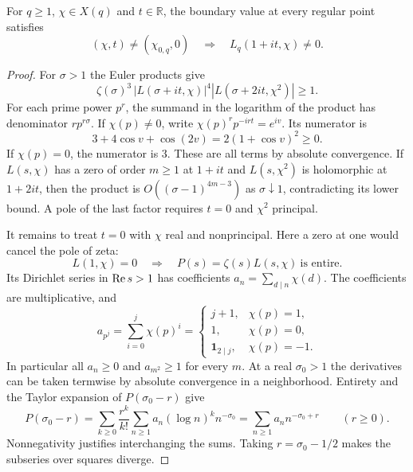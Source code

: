 \begin{lemma}\label{lem:boundary}
For \(q\ge1\), \(\chi\in X(q)\) and \(t\in\mathbb R\), the boundary
value at every regular point satisfies
\[
   (\chi,t)\ne(\chi_{0,q},0)\quad\Longrightarrow\quad
                       L_q(1+it,\chi)\ne0 .
\]
\end{lemma}

\begin{proof}
For \(\sigma>1\) the Euler products give
\[
 \zeta(\sigma)^3\,|L(\sigma+it,\chi)|^4
             |L(\sigma+2it,\chi^2)|\geq 1.
\]
For each prime power \(p^r\), the summand in the logarithm of
the product has denominator \(rp^{r\sigma}\). If \(\chi(p)\ne0\),
write \(\chi(p)^rp^{-irt}=e^{iv}\). Its numerator is
\[
             3+4\cos v+\cos(2v)=2(1+\cos v)^2\ge0.
\]
If \(\chi(p)=0\), the numerator is \(3\). These are all terms by
absolute convergence. If \(L(s,\chi)\) has a zero of order \(m\ge1\)
at \(1+it\) and \(L(s,\chi^2)\) is holomorphic at \(1+2it\),
then the product is \(O((\sigma-1)^{4m-3})\) as
\(\sigma\downarrow1\), contradicting its lower bound. A pole of
the last factor requires \(t=0\) and \(\chi^2\) principal.

It remains to treat \(t=0\) with \(\chi\) real and nonprincipal. Here a zero at one would cancel the pole of zeta:
\[
 L(1,\chi)=0\quad\Longrightarrow\quad P(s)=\zeta(s)L(s,\chi)\ \text{is entire}.
\] Its Dirichlet series in
\(\operatorname{Re} s>1\) has coefficients \(a_n=\sum_{d\mid n}\chi(d)\).
The coefficients are multiplicative, and
\[
 a_{p^j}=\sum_{i=0}^j\chi(p)^i
   =\begin{cases}
        j+1,&\chi(p)=1,\\
        1,&\chi(p)=0,\\
        \mathbf 1_{2\mid j},&\chi(p)=-1.
     \end{cases}
\]
In particular all \(a_n\ge0\) and \(a_{m^2}\ge1\) for every \(m\). At a real \(\sigma_0>1\) the derivatives can
be taken termwise by absolute convergence in a neighborhood.
Entirety and the Taylor expansion of \(P(\sigma_0-r)\) give
\[
 P(\sigma_0-r)=\sum_{k\geq 0}\frac{r^k}{k!}
             \sum_{n\geq 1}a_n(\log n)^k n^{-\sigma_0}
             =\sum_{n\geq 1}a_n n^{-\sigma_0+r}\qquad(r\geq 0).
\]
Nonnegativity justifies interchanging the sums. Taking
\(r=\sigma_0-1/2\) makes the subseries over squares diverge.
\end{proof}
